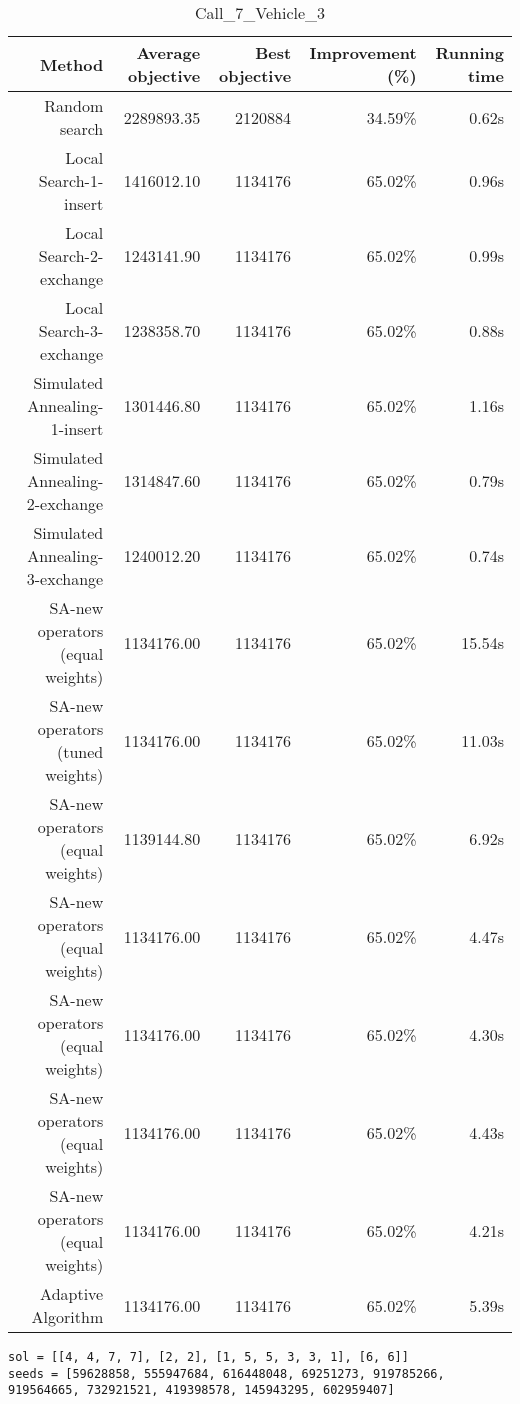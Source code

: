 \begin{table}[ht]
\centering
\caption{Call\_7\_Vehicle\_3}
\label{tab:call7vehicle3}
\begin{tabular}{|r|r|r|r|r|}
Method & Average objective & Best objective & Improvement (\%) & Running time \\
\hline
Random search & 2289893.35 & 2120884 & 34.59\% & 0.62s\\
Local Search-1-insert & 1416012.10 & 1134176 & 65.02\% & 0.96s\\
Local Search-2-exchange & 1243141.90 & 1134176 & 65.02\% & 0.99s\\
Local Search-3-exchange & 1238358.70 & 1134176 & 65.02\% & 0.88s\\
Simulated Annealing-1-insert & 1301446.80 & 1134176 & 65.02\% & 1.16s\\
Simulated Annealing-2-exchange & 1314847.60 & 1134176 & 65.02\% & 0.79s\\
Simulated Annealing-3-exchange & 1240012.20 & 1134176 & 65.02\% & 0.74s\\
SA-new operators (equal weights) & 1134176.00 & 1134176 & 65.02\% & 15.54s\\
SA-new operators (tuned weights) & 1134176.00 & 1134176 & 65.02\% & 11.03s\\
SA-new operators (equal weights) & 1139144.80 & 1134176 & 65.02\% & 6.92s\\
SA-new operators (equal weights) & 1134176.00 & 1134176 & 65.02\% & 4.47s\\
SA-new operators (equal weights) & 1134176.00 & 1134176 & 65.02\% & 4.30s\\
SA-new operators (equal weights) & 1134176.00 & 1134176 & 65.02\% & 4.43s\\
SA-new operators (equal weights) & 1134176.00 & 1134176 & 65.02\% & 4.21s\\
Adaptive Algorithm & 1134176.00 & 1134176 & 65.02\% & 5.39s\\
\end{tabular}%
\end{table}
\begin{lstlisting}[label={lst:call7vehicle3},caption=Optimal solution call\_7\_vehicle\_3]
sol = [[4, 4, 7, 7], [2, 2], [1, 5, 5, 3, 3, 1], [6, 6]]
seeds = [59628858, 555947684, 616448048, 69251273, 919785266, 919564665, 732921521, 419398578, 145943295, 602959407]
\end{lstlisting}%
\clearpage


